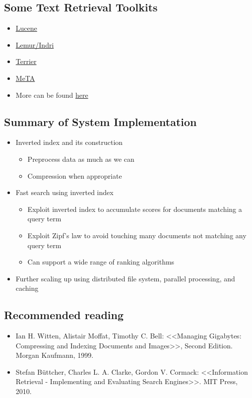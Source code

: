 \subsection{Some Text Retrieval Toolkits}
\begin{itemize}
\item \href{http://lucene.apache.org/}{Lucene}
\item \href{http://www.lemurproject.org/}{Lemur/Indri}
\item \href{http://terrier.org/}{Terrier}
\item \href{http://meta-toolkit.github.io/meta/}{MeTA}
\item More can be found \href{http://timan.cs.uiuc.edu/resources}{here}
\end{itemize}


\subsection{Summary of System Implementation}
\begin{itemize}
\item Inverted index and its construction 
\begin{itemize}
\item Preprocess data as much as we can 
\item Compression when appropriate
\end{itemize}

\item Fast search using inverted index
\begin{itemize}
\item Exploit inverted index to accumulate scores for documents matching
a query term
\item Exploit Zipf’s law to avoid touching many documents not matching any query term
\item Can support a wide range of ranking algorithms
\end{itemize}

\item Further scaling up using distributed file system, parallel processing, and caching
\end{itemize}


\subsection{Recommended reading}
\begin{itemize}
\item Ian H. Witten, Alistair Moffat, Timothy C. Bell: <<Managing Gigabytes: Compressing and Indexing Documents and Images>>, Second Edition. Morgan Kaufmann, 1999.
\item Stefan B{\"u}ttcher, Charles L. A. Clarke, Gordon V. Cormack: <<Information Retrieval - Implementing and Evaluating Search Engines>>. MIT Press, 2010.
\end{itemize}
